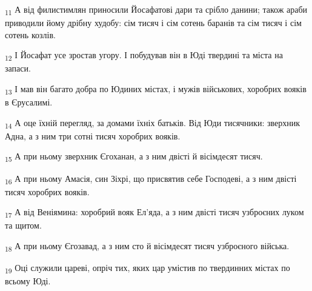 \begin{tcolorbox}
\textsubscript{11} А від филистимлян приносили Йосафатові дари та срібло данини; також араби приводили йому дрібну худобу: сім тисяч і сім сотень баранів та сім тисяч і сім сотень козлів.
\end{tcolorbox}
\begin{tcolorbox}
\textsubscript{12} І Йосафат усе зростав угору. І побудував він в Юді твердині та міста на запаси.
\end{tcolorbox}
\begin{tcolorbox}
\textsubscript{13} І мав він багато добра по Юдиних містах, і мужів військових, хоробрих вояків в Єрусалимі.
\end{tcolorbox}
\begin{tcolorbox}
\textsubscript{14} А оце їхній перегляд, за домами їхніх батьків. Від Юди тисячники: зверхник Адна, а з ним три сотні тисяч хоробрих вояків.
\end{tcolorbox}
\begin{tcolorbox}
\textsubscript{15} А при ньому зверхник Єгоханан, а з ним двісті й вісімдесят тисяч.
\end{tcolorbox}
\begin{tcolorbox}
\textsubscript{16} А при ньому Амасія, син Зіхрі, що присвятив себе Господеві, а з ним двісті тисяч хоробрих вояків.
\end{tcolorbox}
\begin{tcolorbox}
\textsubscript{17} А від Веніямина: хоробрий вояк Ел'яда, а з ним двісті тисяч узброєних луком та щитом.
\end{tcolorbox}
\begin{tcolorbox}
\textsubscript{18} А при ньому Єгозавад, а з ним сто й вісімдесят тисяч узброєного війська.
\end{tcolorbox}
\begin{tcolorbox}
\textsubscript{19} Оці служили цареві, опріч тих, яких цар умістив по твердинних містах по всьому Юді.
\end{tcolorbox}
